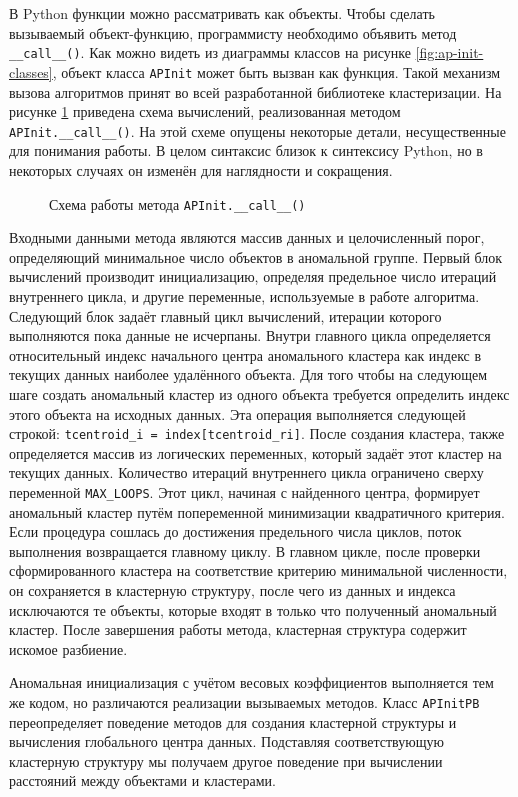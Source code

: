 \documentclass[12pt]{diploma}
\begin{document}
	В Python функции можно рассматривать как объекты. Чтобы сделать вызываемый объект-функцию, программисту необходимо объявить метод \texttt{\_\_call\_\_()}. Как можно видеть из диаграммы классов на рисунке \ref{fig:ap-init-classes}, объект класса \texttt{APInit} может быть вызван как функция. Такой механизм вызова алгоритмов принят во всей разработанной библиотеке кластеризации. На рисунке \ref{fig:ap-init} приведена схема вычислений, реализованная методом \texttt{APInit.\_\_call\_\_()}. На этой схеме опущены некоторые детали, несущественные для понимания работы. В целом синтаксис близок к синтексису Python, но в некоторых случаях он изменён для наглядности и сокращения.
	\begin{figure}[h!]
		\centering
		
		\caption{Схема работы метода \texttt{APInit.\_\_call\_\_()}}
		\label{fig:ap-init}
	\end{figure}
	
	Входными данными метода являются массив данных и целочисленный порог, определяющий минимальное число объектов в аномальной группе. Первый блок вычислений производит инициализацию, определяя предельное число итераций внутреннего цикла, и другие переменные, используемые в работе алгоритма. Следующий блок задаёт главный цикл вычислений, итерации которого выполняются пока данные не исчерпаны. Внутри главного цикла определяется относительный индекс начального центра аномального кластера как индекс в текущих данных наиболее удалённого объекта. Для того чтобы на следующем шаге создать аномальный кластер из одного объекта требуется определить индекс этого объекта на исходных данных. Эта операция выполняется следующей строкой: \texttt{tcentroid\_i = index[tcentroid\_ri]}. После создания кластера, также определяется массив из логических переменных, который задаёт этот кластер на текущих данных. Количество итераций внутреннего цикла ограничено сверху переменной \texttt{MAX\_LOOPS}. Этот цикл, начиная с найденного центра, формирует аномальный кластер путём попеременной минимизации квадратичного критерия. Если процедура сошлась до достижения предельного числа циклов, поток выполнения возвращается главному циклу. В главном цикле, после проверки сформированного кластера на соответствие критерию минимальной численности, он сохраняется в кластерную структуру, после чего из данных и индекса исключаются те объекты, которые входят в только что полученный аномальный кластер. После завершения работы метода, кластерная структура содержит искомое разбиение.

	Аномальная инициализация с учётом весовых коэффициентов выполняется тем же кодом, но различаются реализации вызываемых методов. Класс \texttt{APInitPB} переопределяет поведение методов для создания кластерной структуры и вычисления глобального центра данных. Подставляя соответствующую кластерную структуру мы получаем другое поведение при вычислении расстояний между объектами и кластерами.
	
\end{document}
